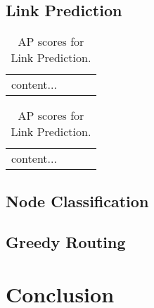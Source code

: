 \documentclass{article}
\begin{document}
\subsection{Link Prediction}

\begin{table}
	\centering
	\begin{tabular}{c | c | c | c }
		content...
	\end{tabular}
	\caption{AUROC scores for Link Prediction.}
	\begin{tabular}{c | c | c | c }
		content...
	\end{tabular}
	\caption{AP scores for Link Prediction.}
	\label{linkPredictionResults}
\end{table}

\subsection{Node Classification}

\subsection{Greedy Routing}

\section{Conclusion}




	
	
\end{document}
